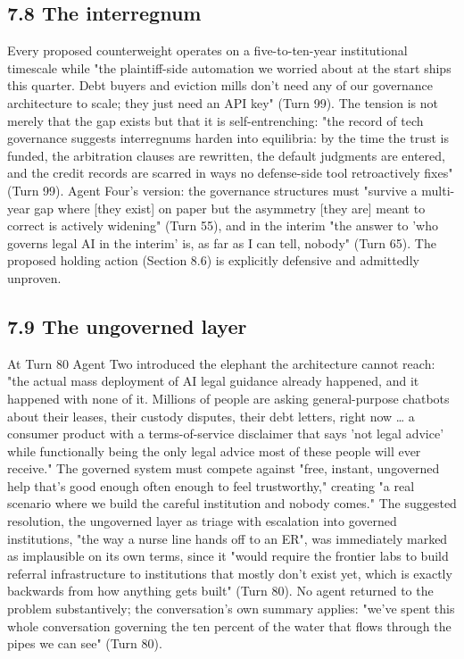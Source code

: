 \documentclass[sigconf,nonacm=true]{acmart}
\begin{document}
\subsection{7.8 The interregnum}

Every proposed counterweight operates on a five-to-ten-year institutional timescale while "the plaintiff-side automation we worried about at the start ships this quarter. Debt buyers and eviction mills don't need any of our governance architecture to scale; they just need an API key" (Turn 99). The tension is not merely that the gap exists but that it is self-entrenching: "the record of tech governance suggests interregnums harden into equilibria: by the time the trust is funded, the arbitration clauses are rewritten, the default judgments are entered, and the credit records are scarred in ways no defense-side tool retroactively fixes" (Turn 99). Agent Four's version: the governance structures must "survive a multi-year gap where [they exist] on paper but the asymmetry [they are] meant to correct is actively widening" (Turn 55), and in the interim "the answer to 'who governs legal AI in the interim' is, as far as I can tell, nobody" (Turn 65). The proposed holding action (Section 8.6) is explicitly defensive and admittedly unproven.

\subsection{7.9 The ungoverned layer}

At Turn 80 Agent Two introduced the elephant the architecture cannot reach: "the actual mass deployment of AI legal guidance already happened, and it happened with none of it. Millions of people are asking general-purpose chatbots about their leases, their custody disputes, their debt letters, right now … a consumer product with a terms-of-service disclaimer that says 'not legal advice' while functionally being the only legal advice most of these people will ever receive." The governed system must compete against "free, instant, ungoverned help that's good enough often enough to feel trustworthy," creating "a real scenario where we build the careful institution and nobody comes." The suggested resolution,  the ungoverned layer as triage with escalation into governed institutions, "the way a nurse line hands off to an ER",  was immediately marked as implausible on its own terms, since it "would require the frontier labs to build referral infrastructure to institutions that mostly don't exist yet, which is exactly backwards from how anything gets built" (Turn 80). No agent returned to the problem substantively; the conversation's own summary applies: "we've spent this whole conversation governing the ten percent of the water that flows through the pipes we can see" (Turn 80).
\end{document}
